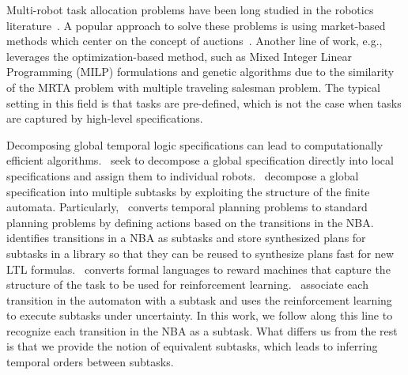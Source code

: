 \documentclass[Afour,sageh,times]{sagej}
\begin{document}
Multi-robot task allocation problems have been long studied in the robotics literature~\citep{korsah2013comprehensive,nunes2017taxonomy,gini2017multi}. A popular approach to solve these problems is using market-based methods which center on the concept of auctions~\cite{zavlanos2007distributed,zavlanos2008distributed,zavlanos2008dynamic,michael2008distributed}. Another line of work, e.g.,~\cite{gombolay2013fast,jones2011time} leverages the optimization-based method, such as Mixed Integer Linear Programming (MILP) formulations and genetic algorithms due to the similarity of the MRTA problem with multiple traveling salesman problem. The typical setting in this field is that tasks are pre-defined, which is not the case when tasks are captured by high-level specifications.


Decomposing global temporal logic specifications can lead to computationally efficient algorithms.~\cite{tumova2015decomposition,kantaros2016distributed} seek to decompose a global specification directly into local specifications and assign them to individual robots.~\cite{camacho2017non,xluo_CDC19,camacho2019ltl,schillinger2019hierarchical} decompose a global specification into multiple subtasks by exploiting the structure of the finite automata. Particularly,~\cite{camacho2017non} converts temporal planning problems to standard planning problems by defining actions based on the transitions in the NBA.~\cite{xluo_CDC19} identifies transitions in a NBA as subtasks and store synthesized plans for subtasks in a library so that they can be reused to synthesize plans fast for new LTL formulas.~\cite{camacho2019ltl} converts formal languages to reward machines that capture the structure of the task to be used for reinforcement learning.~\cite{schillinger2019hierarchical} associate each transition in the automaton with a subtask and uses the reinforcement learning to execute subtasks under uncertainty. In this work, we follow along this line to recognize each transition in the NBA as a subtask. What differs us from the rest is that we provide the notion of equivalent subtasks, which leads to inferring temporal orders between subtasks.
\end{document}
